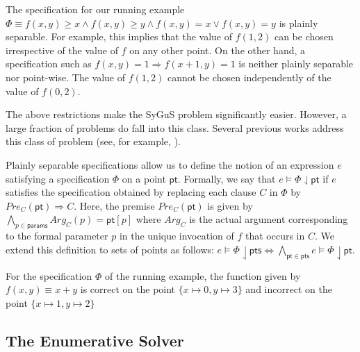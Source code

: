 \documentclass{llncs}
\newcommand\arsays[1]{{\color{red} \bf AR: #1}}
\newcommand\Points{\mathsf{pts}}
\newcommand\Point{\mathsf{pt}}
\newcommand\Expr{e}
\newcommand\Spec{\Phi}
\newcommand\SynthFun{f}
\newcommand\FormalParameters{\mathsf{params}}
\newcommand{\sygus}{{\sffamily\fontsize{8.5}{10}\selectfont
    SyGuS}\xspace}
\begin{document}
\begin{example}
  The specification for our running example $\Spec \equiv \SynthFun(x,
  y) \geq x \wedge \SynthFun(x, y) \geq y \wedge \SynthFun(x, y) = x
  \vee \SynthFun(x, y) = y$ is plainly separable.
  For example, this implies that the value of $\SynthFun(1, 2)$ can be
  chosen irrespective of the value of $\SynthFun$ on any other point.
  On the other hand, a specification such as $\SynthFun(x, y) = 1
  \Rightarrow \SynthFun(x + 1, y) = 1$ is neither plainly separable nor
  point-wise.
  The value of $\SynthFun(1, 2)$ cannot be chosen independently of the
  value of $\SynthFun(0, 2)$.
\end{example}

The above restrictions make the \sygus problem significantly easier.
However, a large fraction of problems do fall into this class.
Several previous works address this class of problem (see, for
example, \cite{alur-15,madhusudan-16-pw,reynolds-15}).


Plainly separable specifications allow us to
define the notion of an expression $\Expr$ satisfying a specification
$\Spec$ on a point $\Point$.
Formally, we say that $\Expr \models \Spec \downharpoonleft
\Point$ if $\Expr$ satisfies the specification obtained by
replacing each clause $C$ in $\Spec$
by $\mathit{Pre}_C(\Point) \Rightarrow C$.
Here, the premise $\mathit{Pre}_C(\Point)$ is given by $\bigwedge_{p \in
\FormalParameters} \mathit{Arg}_C(p) = \Point[p]$ where $\mathit{Arg}_C$ is the
actual argument corresponding to the formal parameter $p$ in the
unique invocation of $\SynthFun$ that occurs in $C$.
We extend this definition to sets of points as follows: $\Expr \models
\Spec \downharpoonleft \Points \Leftrightarrow \bigwedge_{\Point \in
\Points} \Expr \models \Spec\downharpoonleft\Point$.

\begin{example}
  \label{ex:running:correctness_on_point}
  For the specification $\Spec$ of the running example, the function
  given by $\SynthFun(x, y) \equiv x + y$ is correct on the point $\{ x
      \mapsto 0, y \mapsto 3 \}$ and incorrect on the point $\{ x
  \mapsto 1, y \mapsto 2 \}$
\end{example}

\subsection{The Enumerative Solver}
\label{sec:enumeration}
\end{document}
